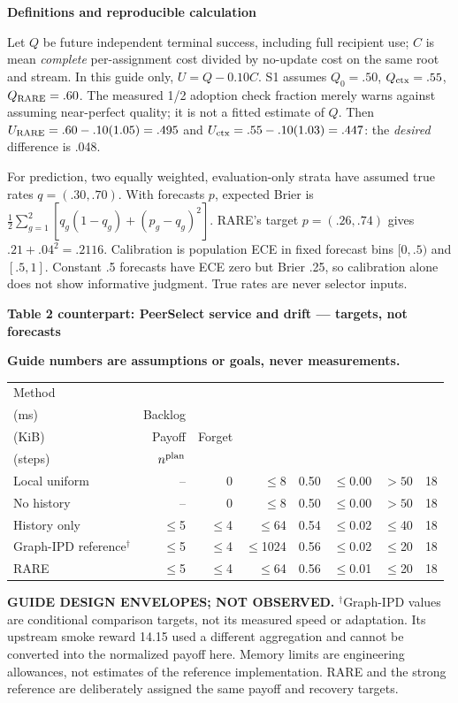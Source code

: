 \documentclass[10pt,a4paper]{article}
\newcommand{\metric}[1]{\makecell[c]{#1}}
\newcommand{\status}{\textcolor{red!70!black}{\textbf{Guide numbers are assumptions or goals, never measurements.}}}
\newcommand{\lead}[1]{\vspace{4pt}\textbf{#1}\par}
\begin{document}
\lead{Definitions and reproducible calculation}
Let $Q$ be future independent terminal success, including full recipient use;
$C$ is mean \emph{complete} per-assignment cost divided by no-update cost on the
same root and stream. In this guide only, $U=Q-0.10C$. S1 assumes
$Q_0=.50$, $Q_{\rm ctx}=.55$, $Q_{\rm RARE}=.60$. The measured 1/2 adoption
check fraction merely warns against assuming near-perfect quality; it is not
a fitted estimate of $Q$. Then $U_{\rm RARE}=.60-.10(1.05)=.495$ and
$U_{\rm ctx}=.55-.10(1.03)=.447$: the \emph{desired} difference is .048.

For prediction, two equally weighted, evaluation-only strata have assumed true
rates $q=(.30,.70)$. With forecasts $p$, expected Brier is
$\frac12\sum_{g=1}^2[q_g(1-q_g)+(p_g-q_g)^2]$.
RARE's target $p=(.26,.74)$ gives $.21+.04^2=.2116$.
Calibration is population ECE in fixed forecast bins $[0,.5)$ and $[.5,1]$.
Constant .5 forecasts have ECE zero but Brier .25, so calibration alone does
not show informative judgment. True rates are never selector inputs.

\clearpage
\lead{Table 2 counterpart: PeerSelect service and drift --- targets, not forecasts}
\status
\begin{center}\small
\begin{tabular}{@{}lrrrrrrr@{}}\toprule
Method & \metric{Update p95\\(ms)} & Backlog & \metric{State\\(KiB)} & Payoff & Forget & \metric{Recovery\\(steps)} & $n^{\rm plan}$\\\midrule
Local uniform & -- & 0 & $\leq$8 & 0.50 & $\leq$0.00 & $>50$ & 18\\
No history & -- & 0 & $\leq$8 & 0.50 & $\leq$0.00 & $>50$ & 18\\
History only & $\leq$5 & $\leq$4 & $\leq$64 & 0.54 & $\leq$0.02 & $\leq$40 & 18\\
Graph-IPD reference$^{\dagger}$ & $\leq$5 & $\leq$4 & $\leq$1024 & 0.56 & $\leq$0.02 & $\leq$20 & 18\\
RARE & $\leq$5 & $\leq$4 & $\leq$64 & 0.56 & $\leq$0.01 & $\leq$20 & 18\\
\bottomrule\end{tabular}\end{center}
\textbf{GUIDE DESIGN ENVELOPES; NOT OBSERVED.} $^{\dagger}$Graph-IPD values are
conditional comparison targets, not its measured speed or adaptation. Its
upstream smoke reward 14.15 used a different aggregation and cannot be converted
into the normalized payoff here. Memory limits are engineering allowances,
not estimates of the reference implementation. RARE and the strong reference
are deliberately assigned the same payoff and recovery targets.
\end{document}
